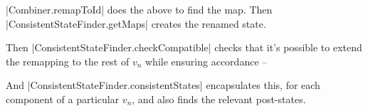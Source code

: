 
\begin{impNote}
|Combiner.remapToId| does the above to find the map.  Then
|ConsistentStateFinder.getMaps| creates the renamed state.

Then |ConsistentStateFinder.checkCompatible| checks that it's possible to
extend the remapping to the rest of $v_n$ while ensuring accordance --

And |ConsistentStateFinder.consistentStates| encapsulates this, for each
component of a particular $v_n$, and also finds the relevant post-states.



\end{impNote}


